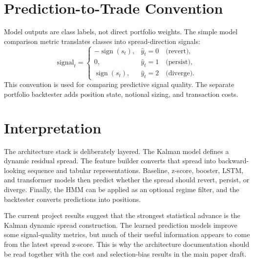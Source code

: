 \documentclass[11pt]{article}
\begin{document}
\section{Prediction-to-Trade Convention}

Model outputs are class labels, not direct portfolio weights. The simple model
comparison metric translates classes into spread-direction signals:
\[
\text{signal}_t =
\begin{cases}
-\operatorname{sign}(s_t), & \hat{y}_t=0 \quad \text{(revert)},\\
0, & \hat{y}_t=1 \quad \text{(persist)},\\
\operatorname{sign}(s_t), & \hat{y}_t=2 \quad \text{(diverge)}.
\end{cases}
\]
This convention is used for comparing predictive signal quality. The separate
portfolio backtester adds position state, notional sizing, and transaction
costs.

\section{Interpretation}

The architecture stack is deliberately layered. The Kalman model defines a
dynamic residual spread. The feature builder converts that spread into
backward-looking sequence and tabular representations. Baseline, z-score,
booster, LSTM, and transformer models then predict whether the spread should
revert, persist, or diverge. Finally, the HMM can be applied as an optional
regime filter, and the backtester converts predictions into positions.

The current project results suggest that the strongest statistical advance is
the Kalman dynamic spread construction. The learned prediction models improve
some signal-quality metrics, but much of their useful information appears to
come from the latest spread z-score. This is why the architecture
documentation should be read together with the cost and selection-bias results
in the main paper draft.
\end{document}
